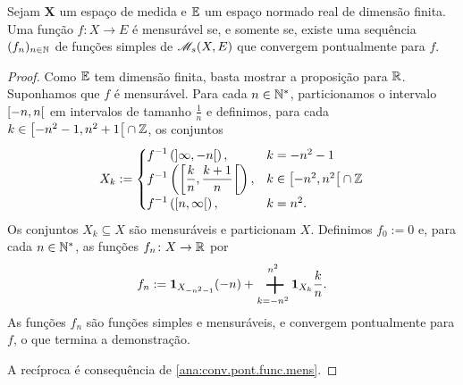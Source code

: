 \begin{proposition}
Sejam $\bm X$ um espaço de medida e $\mathbb{E}$ um espaço normado real de dimensão finita. Uma função $f\colon X \to E$ é mensurável se, e somente se, existe uma sequência $(f_n)_{n \in \mathbb{N}}$ de funções simples de $\mathscr{M}_s(X,E)$ que convergem pontualmente para $f$.
\end{proposition}
\begin{proof}
Como $\mathbb{E}$ tem dimensão finita, basta mostrar a proposição para $\mathbb{R}$. Suponhamos que $f$ é mensurável. Para cada $n \in \mathbb{N}^*$, particionamos o intervalo $\left[{-n},{n}\right[$ em intervalos de tamanho $\frac{1}{n}$ e definimos, para cada $k \in \left[{-n^2-1},{n^2+1}\right[ \cap \mathbb{Z}$, os conjuntos
	\begin{equation*}
	X_k := 
	\begin{cases}
		\displaystyle f^{-1}\left( \left]{\infty},{-n}\right[ \right),& k=-n^2-1 \\
		\displaystyle f^{-1}\left( \left[{\frac{k}{n}},{\frac{k+1}{n}}\right[ \right),& k \in \left[{-n^2},{n^2}\right[ \cap \mathbb{Z} \\
		\displaystyle f^{-1}\left( \left[{n},{\infty}\right[ \right),& k=n^2.
	\end{cases}
	\end{equation*}
Os conjuntos $X_k \subseteq X$ são mensuráveis e particionam $X$. Definimos $f_0 := 0$ e, para cada $n \in \mathbb{N}^*$, as funções $f_n\colon X \to \mathbb{R}$ por
	\begin{equation*}
	f_n := \idc_{X_{-n^2-1}} (-n) + \sum_{k=-n^2}^{n^2} \idc_{X_k} \frac{k}{n}.
	\end{equation*}
As funções $f_n$ são funções simples e mensuráveis, e convergem pontualmente para $f$, o que termina a demonstração.

A recíproca é consequência de \ref{ana:conv.pont.func.mens}.
\end{proof}

